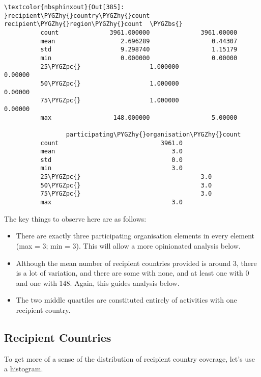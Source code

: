 \documentclass[letterpaper,10pt,english]{sphinxmanual}
\begin{document}
\begin{Verbatim}[commandchars=\\\{\}]
\textcolor{nbsphinxout}{Out[385]: }recipient\PYGZhy{}country\PYGZhy{}count  recipient\PYGZhy{}region\PYGZhy{}count  \PYGZbs{}
          count              3961.000000              3961.00000
          mean                  2.696289                 0.44307
          std                   9.298740                 1.15179
          min                   0.000000                 0.00000
          25\PYGZpc{}                   1.000000                 0.00000
          50\PYGZpc{}                   1.000000                 0.00000
          75\PYGZpc{}                   1.000000                 0.00000
          max                 148.000000                 5.00000
          
                 participating\PYGZhy{}organisation\PYGZhy{}count
          count                            3961.0
          mean                                3.0
          std                                 0.0
          min                                 3.0
          25\PYGZpc{}                                 3.0
          50\PYGZpc{}                                 3.0
          75\PYGZpc{}                                 3.0
          max                                 3.0
\end{Verbatim}

The key things to observe here are as follows:
\begin{itemize}
\item {} 
There are exactly three participating organisation elements in every
element (max = 3; min = 3). This will allow a more opinionated
analysis below.

\item {} 
Although the mean number of recipient countries provided is around 3,
there is a lot of variation, and there are some with none, and at
least one with 0 and one with 148. Again, this guides analysis below.

\item {} 
The two middle quartiles are constituted entirely of activities with
one recipient country.

\end{itemize}


\subsection{Recipient Countries}
\label{\detokenize{Global Affairs Canada - Compliance Report:Recipient-Countries}}
To get more of a sense of the distribution of recipient country
coverage, let's use a histogram.
\end{document}
